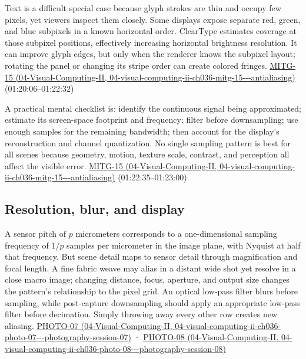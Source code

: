Text is a difficult special case because glyph strokes are thin and occupy few pixels, yet viewers inspect them closely. Some displays expose separate red, green, and blue subpixels in a known horizontal order. ClearType estimates coverage at those subpixel positions, effectively increasing horizontal brightness resolution. It can improve glyph edges, but only when the renderer knows the subpixel layout; rotating the panel or changing its stripe order can create colored fringes. \href{../04-Visual-Computing-II/main.pdf\#nameddest=04-visual-computing-ii-ch036-mitg-15---antialiasing}{MITG-15 (04-Visual-Computing-II, 04-visual-computing-ii-ch036-mitg-15-\/-\/-antialiasing)} (01:20:06--01:22:32)

A practical mental checklist is: identify the continuous signal being approximated; estimate its screen-space footprint and frequency; filter before downsampling; use enough samples for the remaining bandwidth; then account for the display's reconstruction and channel quantization. No single sampling pattern is best for all scenes because geometry, motion, texture scale, contrast, and perception all affect the visible error. \href{../04-Visual-Computing-II/main.pdf\#nameddest=04-visual-computing-ii-ch036-mitg-15---antialiasing}{MITG-15 (04-Visual-Computing-II, 04-visual-computing-ii-ch036-mitg-15-\/-\/-antialiasing)} (01:22:35--01:23:00)

\subsection{Resolution, blur, and display}\label{03-visual-computing-i-ch004-resolution-blur-and-display}

A sensor pitch of \(p\) micrometers corresponds to a one-dimensional sampling frequency of \(1/p\) samples per micrometer in the image plane, with Nyquist at half that frequency. But scene detail maps to sensor detail through magnification and focal length. A fine fabric weave may alias in a distant wide shot yet resolve in a close macro image; changing distance, focus, aperture, and output size changes the pattern's relationship to the pixel grid. An optical low-pass filter blurs before sampling, while post-capture downsampling should apply an appropriate low-pass filter before decimation. Simply throwing away every other row creates new aliasing. \href{../04-Visual-Computing-II/main.pdf\#nameddest=04-visual-computing-ii-ch036-photo-07---photography-session-07}{PHOTO-07 (04-Visual-Computing-II, 04-visual-computing-ii-ch036-photo-07-\/-\/-photography-session-07)} · \href{../04-Visual-Computing-II/main.pdf\#nameddest=04-visual-computing-ii-ch036-photo-08---photography-session-08}{PHOTO-08 (04-Visual-Computing-II, 04-visual-computing-ii-ch036-photo-08-\/-\/-photography-session-08)}


